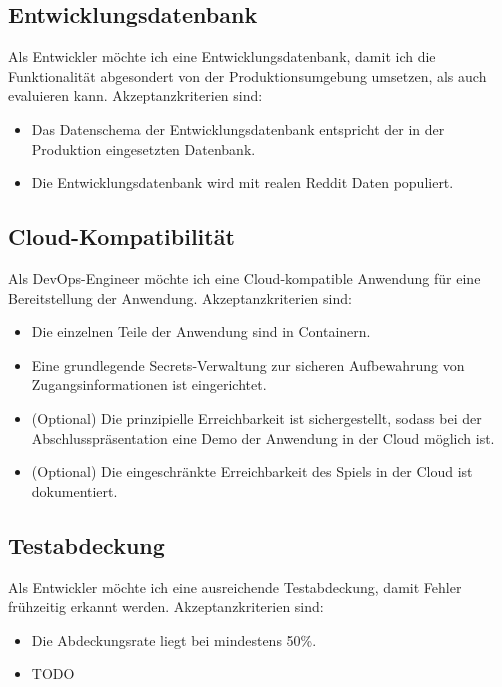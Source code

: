 \documentclass[a4paper, 10pt, conference]{ieeeconf}
\begin{document}
\subsection{Entwicklungsdatenbank}

Als Entwickler möchte ich eine Entwicklungsdatenbank, damit ich die Funktionalität abgesondert von der Produktionsumgebung umsetzen, als auch evaluieren kann.  Akzeptanzkriterien sind:
\begin{itemize}
\item Das Datenschema der Entwicklungsdatenbank entspricht der in der Produktion eingesetzten Datenbank.
\item Die Entwicklungsdatenbank wird mit realen Reddit Daten populiert.
\end{itemize}

\subsection{Cloud-Kompatibilität}

Als DevOps-Engineer möchte ich eine Cloud-kompatible Anwendung für eine Bereitstellung der Anwendung.  Akzeptanzkriterien sind:
\begin{itemize}
\item Die einzelnen Teile der Anwendung sind in Containern.
\item Eine grundlegende Secrets-Verwaltung zur sicheren Aufbewahrung von Zugangsinformationen ist eingerichtet.
\item (Optional) Die prinzipielle Erreichbarkeit ist sichergestellt,  sodass bei der Abschlusspräsentation eine Demo der Anwendung in der Cloud möglich ist.
\item (Optional) Die eingeschränkte Erreichbarkeit des Spiels in der Cloud ist dokumentiert.
\end{itemize}

\subsection{Testabdeckung}

Als Entwickler möchte ich eine ausreichende Testabdeckung,  damit Fehler frühzeitig erkannt werden.  Akzeptanzkriterien sind:
\begin{itemize}
\item Die Abdeckungsrate liegt bei mindestens 50\%.
\item TODO
\end{itemize}
\end{document}
